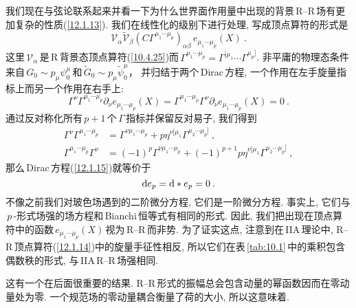 我们现在与弦论联系起来并看一下为什么世界面作用量中出现的背景\,R--R\,场有更加复杂的性质(\ref{12.1.13}). 我们在线性化的级别下进行处理, 写成顶点算符的形式是
\begin{equation}
    \mathscr{V}_{\alpha}\tilde{\mathscr{V}}_{\beta}(C\Gamma^{\mu_{1}\cdots\mu_{p}})_{\alpha\beta}\,e_{\mu_{1}\cdots\mu_{p}}(X) \:. \label{12.1.14}
\end{equation}
这里$\,\mathscr{V}_{\alpha}\,$是\,R\,背景态顶点算符(\ref{10.4.25})而$\,\Gamma^{\mu_{1}\cdots\mu_{p}}=\Gamma^{[\mu_{1}}\cdots\Gamma^{\mu_{p}]}$. 非平庸的物理态条件来自$\,G_{0}\sim p_{\mu}\psi_{0}^{\mu}\,$和$\,\tilde{G}_{0}\sim p_{\mu}\tilde{\psi}_{0}^{\mu}$， 并归结于两个\,Dirac\,方程, 一个作用在左手旋量指标上而另一个作用在右手上:
\begin{equation}
    \Gamma^{\nu}\Gamma^{\mu_{1}\cdots\mu_{p}}\partial_{\nu}e_{\mu_{1}\cdots \mu_{p}}(X)=
    \Gamma^{\mu_{1}\cdots\mu_{p}}\Gamma^{\nu}\partial_{\nu}e_{\mu_{1}\cdots \mu_{p}}(X)=0\:.\label{12.1.15}
\end{equation}
通过反对称化所有\,$p+1$\,个\,$\Gamma\,$指标并保留反对易子, 我们得到
\begin{subequations}
    \begin{align}
        \Gamma^{\nu}\Gamma^{\mu_{1}\cdots\mu_{p}}&=\Gamma^{\nu\mu_{1}\cdots\mu_{p}}+p\eta^{\nu[\mu_{1}}\Gamma^{\mu_{2}\cdots\mu_{p}]}\:, \label{12.1.16a} \\  
        \Gamma^{\mu_{1}\cdots\mu_{p}}\Gamma^{\nu}&=(-1)^{p}\Gamma^{\nu\mu_{1}\cdots\mu_{p}}+(-1)^{p+1}p\eta^{\nu[\mu_{1}}\Gamma^{\mu_{2}\cdots\mu_{p}]}\:, \label{12.1.16b} 
    \end{align} \label{12.1.16}
\end{subequations}
那么\,Dirac\,方程(\ref{12.1.15})就等价于
\begin{equation}
    \mathrm{d} e_{p} = \mathrm{d}\ast e_{p}=0 \:. \label{12.1.17}
\end{equation}
不像之前我们对玻色场遇到的二阶微分方程, 它们是一阶微分方程. 事实上, 它们与$\,p\,$-形式场强的场方程和\,Bianchi\,恒等式有相同的形式. 因此, 我们把出现在顶点算符中的函数$\,e_{\mu_{1}\cdots \mu_{p}}(X)\,$视为\,R--R\,{}而非势. 为了证实这点, 注意到在\,IIA\,理论中, R--R\,顶点算符(\ref{12.1.14})中的旋量手征性相反, 所以它们在表\,\ref{tab:10.1}\,中的乘积包含偶数秩的形式, 与\,IIA\,R--R\,场强相同.

这有一个在后面很重要的结果. R--R\,形式的振幅总会包含动量的幂函数因而在零动量处为零. 一个规范场的零动量耦合衡量了荷的大小, 所以这意味着{}.

